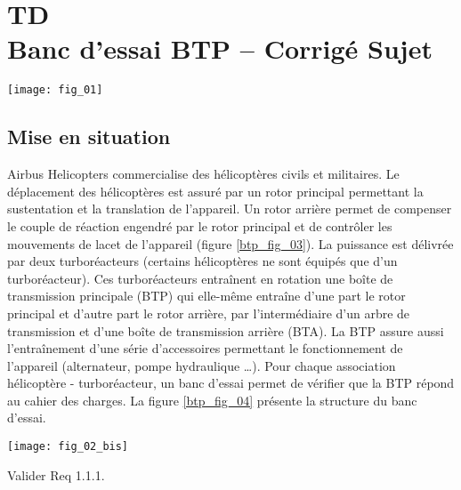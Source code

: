 \chapter*{TD  \\ 
Banc d'essai BTP -- \ifprof Corrigé \else Sujet \fi}
\ifprof {} \else  \fi
\setcounter{question}{0}

\begin{marginfigure}
\texttt{[image: fig\_01]}
\end{marginfigure}


\section*{Mise en situation}
\ifprof
\else
Airbus Helicopters commercialise des hélicoptères civils et militaires. Le déplacement des hélicoptères est assuré par un rotor principal permettant la sustentation et la translation de l'appareil. Un rotor arrière permet de compenser le couple de réaction engendré par le rotor principal et de contrôler les mouvements de lacet de l'appareil (figure \ref{btp_fig_03}).
La puissance est délivrée par deux turboréacteurs (certains hélicoptères ne sont équipés que d'un turboréacteur). Ces turboréacteurs entraînent en rotation une boîte de transmission principale (BTP) qui elle-même entraîne d'une part le rotor principal et d'autre part le rotor arrière, par l'intermédiaire d'un arbre de transmission et d'une boîte de transmission arrière (BTA). La BTP assure aussi l'entraînement d'une série d'accessoires permettant le fonctionnement de l'appareil (alternateur, pompe hydraulique …).
Pour chaque association hélicoptère - turboréacteur, un banc d'essai permet de vérifier que la BTP répond au cahier des charges. La figure \ref{btp_fig_04} présente la structure du banc d'essai.

\fi


\begin{marginfigure}
\centering
\texttt{[image: fig\_02\_bis]}
\end{marginfigure}

\begin{obj}
	Valider Req 1.1.1.
\end{obj}

\ifprof
\else


\begin{figure}[!h]%
    \centering
\end{figure}
\fi

